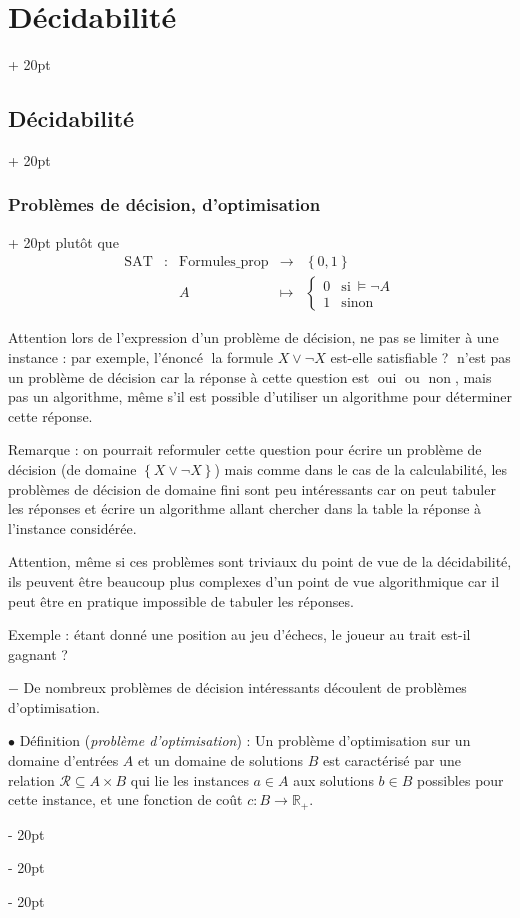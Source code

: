 \documentclass[a4paper, 12pt, twoside]{article}
\newcommand{\R}{\mathbb{R}} %
\newcommand{\set}[1]{\left\{ #1 \right\}}
\newcommand{\simplecit}[1]{\guillemotleft$\;$#1$\;$\guillemotright}
\newcommand{\ind}[1][20pt]{\advance\leftskip + #1}
\newcommand{\deind}[1][20pt]{\advance\leftskip - #1}
\newenvironment{indt}[2][20pt]{#2 \par \ind[#1]}{\par \deind} %
\begin{document}
\begin{indt}{\section{Décidabilité}}
\begin{indt}{\subsection{Décidabilité}}
\begin{indt}{\subsubsection{Problèmes de décision, d'optimisation}}
                plutôt que
                \[
                    \begin{array}{ccccl}
                        \mathrm{SAT}
                        & : & \mathrm{Formules\_prop}
                        & \longrightarrow & \set{0, 1}
                        \\
                        && A & \longmapsto &
                        \begin{cases}
                            0 & \text{si}\ \vDash \neg A
                            \\
                            1 & \text{sinon}
                        \end{cases}
                    \end{array}
                \]

                Attention lors de l'expression d'un problème de décision, ne pas se limiter à une instance : par exemple, l'énoncé \simplecit{la formule $X \vee \neg X$ est-elle satisfiable ?} n'est pas un problème de décision car la réponse à cette question est \simplecit{oui} ou \simplecit{non}, mais pas un algorithme, même s'il est possible d'utiliser un algorithme pour déterminer cette réponse.

                Remarque : on pourrait reformuler cette question pour écrire un problème de décision (de domaine $\set{X \vee \neg X}$) mais comme dans le cas de la calculabilité, les problèmes de décision de domaine fini sont peu intéressants car on peut tabuler les réponses et écrire un algorithme allant chercher dans la table la réponse à l'instance considérée.

                Attention, même si ces problèmes sont triviaux du point de vue de la décidabilité, ils peuvent être beaucoup plus complexes d'un point de vue algorithmique car il peut être en pratique impossible de tabuler les réponses.

                Exemple : étant donné une position au jeu d'échecs, le joueur au trait est-il gagnant ?

                \vspace{6pt}
                
                $-$ De nombreux problèmes de décision intéressants découlent de problèmes d'optimisation.

                \vspace{12pt}
                
                $\bullet$ Définition (\textit{problème d'optimisation}) :
                Un problème d'optimisation sur un domaine d'entrées $A$ et un domaine de solutions $B$ est caractérisé par une relation $\mathcal R \subseteq A \times B$ qui lie les instances $a \in A$ aux solutions $b \in B$ possibles pour cette instance, et une fonction de coût $c : B \longrightarrow \R_+$.


\end{indt}
\end{indt}
\end{indt}
\end{document}
